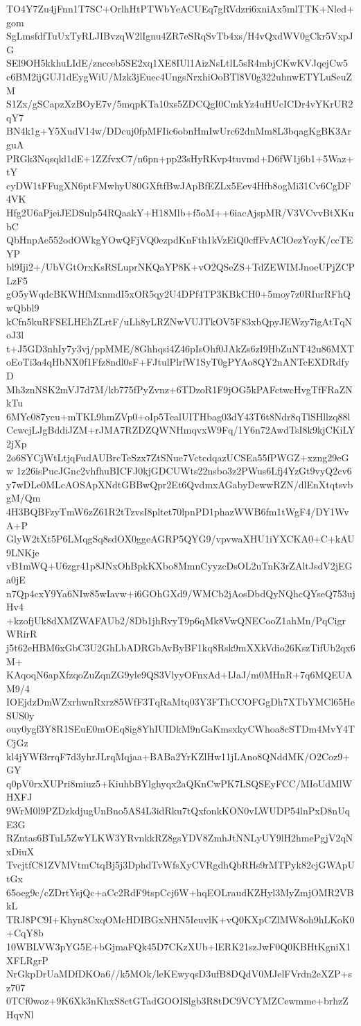 TO4Y7Zu4jFnn1T7SC+OrlhHtPTWbYeACUEq7gRVdzri6xniAx5mlTTK+Nled+gom
SgLmsfdfTuUxTyRLJIBvzqW2lIgnu4ZR7eSRqSvTb4xs/H4vQxdWV0gCkr5VxpJG
SEl9OH5kkhuLIdE/zncceb5SE2xq1XE8IUl1AizNsLtlL5sR4mbjCKwKVJqejCw5
c6BM2ijGUJ1dEygWiU/Mzk3jEuec4UngsNrxhiOoBTl8V0g322uhnwETYLuSeuZM
S1Zx/gSCapzXzBOyE7v/5mqpKTa10xs5ZDCQgI0CmkYz4uHUcICDr4vYKrUR2qY7
BN4k1g+Y5XudV14w/DDcuj0fpMFIic6obnHmIwUrc62dnMm8L3bqagKgBK3ArguA
PRGk3Nqsqkl1dE+1ZZfvxC7/n6pn+pp23sHyRKvp4tuvmd+D6fW1j6b1+5Waz+tY
cyDW1tFFugXN6ptFMwhyU80GXftfBwJApBfEZLx5Eev4Hfb8ogMi31Cv6CgDF4VK
Hfg2U6aPjeiJEDSulp54RQaakY+H18Mlb+f5oM++6iacAjspMR/V3VCvvBtXKubC
QbHnpAe552odOWkgYOwQFjVQ0ezpdKnFth1kVzEiQ0cffFvAClOezYoyK/ccTEYP
bl9Iji2+/UbVGtOrxKsRSLuprNKQaYP8K+vO2QSeZS+TdZEWIMJnoeUPjZCPLzF5
gO5yWqdcBKWHfMxnmdI5xOR5qy2U4DPf4TP3KBkCH0+5moy7z0RIurRFhQwQbbl9
kCfn5kuRFSELHEhZLrtF/uLh8yLRZNwVUJTkOV5F83xbQpyJEWzy7igAtTqNoJ3l
t+J5GD3nhIy7y3vj/ppMME/8Ghhqsi4Z46pIsOhf0JAkZs6zI9HbZuNT42u86MXT
oEoTi3a4qHbNX0f1Ffz8ndl0sF+FJtulPlrfW1SyT0gPYAo8QY2nANTcEXDRdfyD
Mh3znNSK2mVJ7d7M/kb775fPyZvnz+6TDzoR1F9jOG5kPAFctwcHvgTfFRaZNkTu
6MYc087ycu+mTKL9hmZVp0+oIp5TealUITHbag03dY43T6t8Ndr8qTlSHllzq88l
CcwcjLJgBddiJZM+rJMA7RZDZQWNHmqvxW9Fq/1Y6n72AwdTsI8k9kjCKiLY2jXp
2o6SYCjWtLtjqFudAUBrcTeSzx7ZtSNue7VctcdqazUCSEa55fPWGZ+xzng29eGw
1z26isPucJGnc2vhfhuBICFJ0kjGDCUWts22nsbo3z2PWus6Lfj4YzGt9vyQ2cv6
y7wDLe0MLcAOSApXNdtGBBwQpr2Et6QvdmxAGabyDewwRZN/dlEnXtqtsvbgM/Qm
4H3BQBFzyTmW6zZ61R2tTzvsI8pltet70lpnPD1phazWWB6fm1tWgF4/DY1WvA+P
GlyW2tXt5P6LMqgSq8sdOX0ggeAGRP5QYG9/vpvwaXHU1iYXCKA0+C+kAU9LNKje
vB1mWQ+U6zgr41p8JNxOhBpkKXbo8MmnCyyzcDsOL2uTnK3rZAltJsdV2jEGa0jE
n7Qp4cxY9Ya6NIw85wIavw+i6GOhGXd9/WMCb2jAosDbdQyNQhcQYseQ753ujHv4
+kzofjUk8dXMZWAFAUb2/8Db1jhRvyT9p6qMk8VwQNECooZ1ahMn/PqCigrWRirR
j5t62eHBM6xGbC3U2GhLbADRGbAvByBF1kq8Rsk9mXXkVdio26KszTifUb2qx6M+
KAqoqN6apXfzqoZuZqnZG9yle9QS3VlyyOFnxAd+IJaJ/m0MHnR+7q6MQEUAM9/4
IOEjdzDmWZxrhwnRxrz85WfF3TqRaMtq03Y3FThCCOFGgDh7XTbYMCl65HeSUS0y
ouy0ygf3Y8R1SEuE0mOEq8ig8YhIUIDkM9nGaKmsxkyCWhoa8cSTDm4MvY4TCjGz
kl4jYWf3rrqF7d3yhrJLrqMqjaa+BABa2YrKZlHw11jLAno8QNddMK/O2Coz9+GY
q0pV0rxXUPri8miuz5+KiuhbBYlghyqx2aQKnCwPK7LSQSEyFCC/MIoUdMlWHXFJ
9WrM0l9PZDzkdjugUnBno5AS4L3idRku7tQxfonkKON0vLWUDP54lnPxD8nUqE3G
RZntas6BTuL5ZwYLKW3YRvnkkRZ8gsYDV8ZmhJtNNLyUY9lH2hmePgjV2qNxDiuX
TvcjtfC81ZVMVtmCtqBj5j3DphdTvWfsXyCVRgdhQbRHs9rMTPyk82cjGWApUtGx
65oeg9c/cZDrtYsjQc+aCc2RdF9tspCcj6W+hqEOLraudKZHyl3MyZmjOMR2VBkL
TRJ8PC9I+Khyn8CxqOMcHDIBGxNHN5IeuvlK+vQ0KXpCZlMW8oh9hLKoK0+CqY8b
10WBLVW3pYG5E+bGjmaFQk45D7CKzXUb+lERK21szJwF0Q0KBHtKgniX1XFLRgrP
NrGkpDrUaMDfDKOa6//k5MOk/leKEwyqsD3ufB8DQdV0MJelFVrdn2eXZP+sz707
0TCf0woz+9K6Xk3nKhxS8ctGTadGOOISlgb3R8tDC9VCYMZCewmme+brhzZHqvNl

